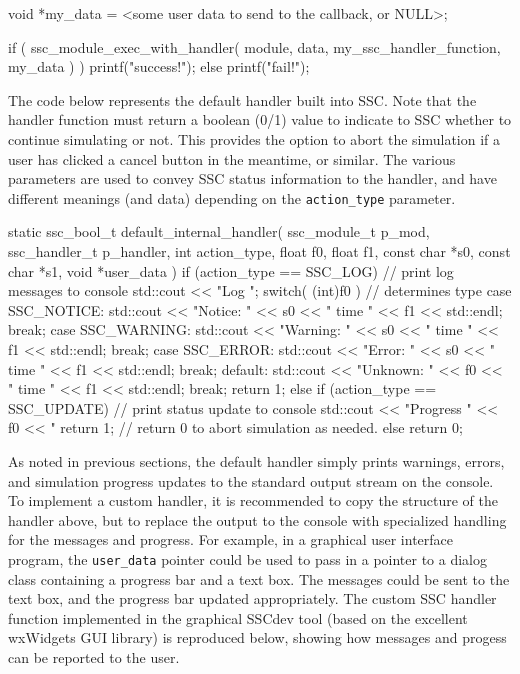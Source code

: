 \documentclass{article}
\begin{document}
\begin{verbatimtab}[4]
void *my_data = <some user data to send to the callback, or NULL>;

if ( ssc_module_exec_with_handler( module, data, my_ssc_handler_function, my_data ) )
	printf("success!\n");
else
	printf("fail!\n");
\end{verbatimtab}

The code below represents the default handler built into SSC.  Note that the handler function must return a boolean (0/1) value to indicate to SSC whether to continue simulating or not.  This provides the option to abort the simulation if a user has clicked a cancel button in the meantime, or similar.  The various parameters are used to convey SSC status information to the handler, and have different meanings (and data) depending on the \texttt{action\_type} parameter.

\begin{verbatimtab}[4]
static ssc_bool_t default_internal_handler( ssc_module_t p_mod, ssc_handler_t p_handler,
	int action_type, float f0, float f1, 
	const char *s0, const char *s1,
	void *user_data )
{
	if (action_type == SSC_LOG)
	{
		// print log messages to console
		std::cout << "Log ";
		switch( (int)f0 ) // determines type
		{
		case SSC_NOTICE: 
			std::cout << "Notice: " << s0 << " time " << f1 << std::endl; 
			break;
		case SSC_WARNING: 
			std::cout << "Warning: " << s0 << " time " << f1 << std::endl; 
			break;
		case SSC_ERROR: 
			std::cout << "Error: " << s0 << " time " << f1 << std::endl; 
			break;
		default: 
			std::cout << "Unknown: " << f0 << " time " << f1 << std::endl; 
			break;
		}
		return 1;
	}
	else if (action_type == SSC_UPDATE)
	{
		// print status update to console
		std::cout << "Progress " << f0 << "%
		return 1; // return 0 to abort simulation as needed.
	}
	else
		return 0;
}
\end{verbatimtab}

As noted in previous sections, the default handler simply prints warnings, errors, and simulation progress updates to the standard output stream on the console.  To implement a custom handler, it is recommended to copy the structure of the handler above, but to replace the output to the console with specialized handling for the messages and progress.  For example, in a graphical user interface program, the \texttt{user\_data} pointer could be used to pass in a pointer to a dialog class containing a progress bar and a text box.  The messages could be sent to the text box, and the progress bar updated appropriately.  The custom SSC handler function implemented in the graphical SSCdev tool (based on the excellent wxWidgets GUI library) is reproduced below, showing how messages and progess can be reported to the user.
\end{document}
